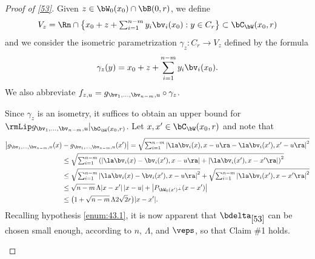 \begin{proof}[Proof of \ref{53}]
Given $z \in \bW_0(x_0) \cap \bB(0,r)$, we define
\begin{equation*}
V_z = \Rn \cap \bigl\{ x_0 + z + \textstyle\sum_{i=1}^{n-m} y_i \bv_i(x_0): y \in C_r \bigr\} \subset \bC_\bW(x_0,r)
\end{equation*}
and we consider the isometric parametrization $\gamma_z: C_r \to V_z$ defined by the formula
\begin{equation*}
\gamma_z(y) = x_0 + z + \sum_{i=1}^{n-m} y_i \bv_i(x_0).
\end{equation*}
We also abbreviate $f_{z,u} = g_{\bv_1,\ldots,\bv_{n-m},u} \circ \gamma_z$.

\begin{Empty*}
Since $\gamma_z$ is an isometry, it suffices to obtain an upper bound for $\rmLip g_{\bv_1,\ldots,\bv_{n-m},u}|_{\bC_\bW(x_0,r)}$.
Let $x,x' \in \bC_\bW(x_0,r)$ and note that
\begin{equation*}
\begin{split}
\big| g_{\bv_1,\ldots,\bv_{n-m},u}(x)& - g_{\bv_1,\ldots,\bv_{n-m},u}(x') \big| = \sqrt{\textstyle\sum_{i=1}^{n-m} \left| \la \bv_i(x),x-u\ra - \la \bv_i(x'),x'-u\ra \right|^2} \\
& \leq \sqrt{\textstyle\sum_{i=1}^{n-m} \left(\left| \la \bv_i(x)-\bv_i(x'),x-u\ra \right| + \left| \la \bv_i(x'),x-x' \ra \right|\right)^2} \\
&\leq \sqrt{\textstyle\sum_{i=1}^{n-m}\left| \la \bv_i(x)-\bv_i(x'),x-u\ra \right|^2} + \sqrt{\textstyle\sum_{i=1}^{n-m}\left| \la \bv_i(x'),x-x' \ra \right|^2}\\
& \leq \sqrt{n-m}\, \Lambda |x-x'|\,|x-u| + \left| P_{\bW_0(x')^\perp}(x-x') \right| \\
& \leq \bigl(1 + \sqrt{n-m}\, \Lambda 2 \sqrt{2}r \bigr) |x-x'|.
\end{split}
\end{equation*}
Recalling hypothesis \eqref{enum:43.1}, it is now apparent that $\bdelta_{\ref{53}}$ can be chosen small enough, according to $n$, $\Lambda$, and $\veps$, so that Claim \#1 holds.
\end{Empty*}


\end{proof}
